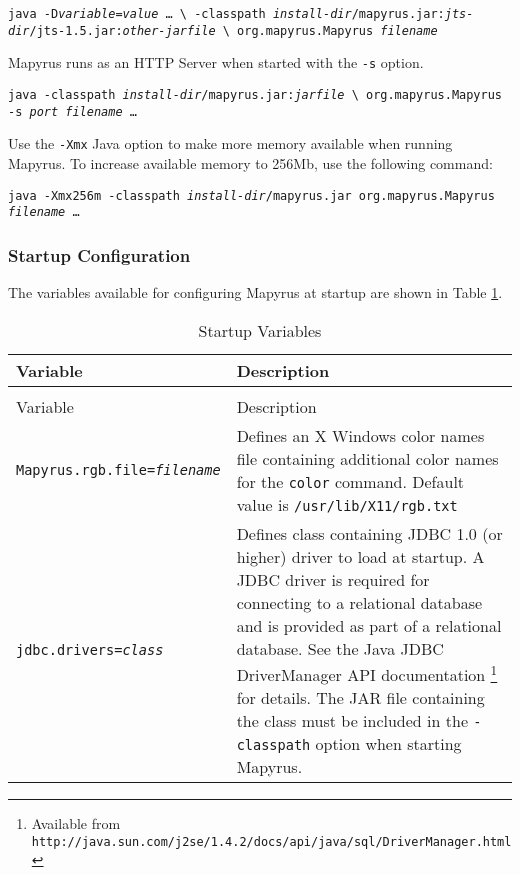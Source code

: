 \begin{alltt}
\texttt{java -D\textit{variable}=\textit{value} \dots\ \textbackslash
  -classpath \textit{install-dir}/mapyrus.jar:\textit{jts-dir}/jts-1.5.jar:\textit{other-jarfile} \textbackslash
  org.mapyrus.Mapyrus \textit{filename}}
\end{alltt}

Mapyrus runs as an HTTP Server when started with the
\texttt{-s} option.

\begin{alltt}
\texttt{java -classpath \textit{install-dir}/mapyrus.jar:\textit{jarfile} \textbackslash
  org.mapyrus.Mapyrus -s \textit{port} \textit{filename} \dots}
\end{alltt}

\label{morememory}
Use the
\texttt{-Xmx} Java option
to make more memory available when running Mapyrus.
To increase available memory to 256Mb, use the following command:

\begin{alltt}
\texttt{java -Xmx256m -classpath \textit{install-dir}/mapyrus.jar org.mapyrus.Mapyrus \textit{filename} \dots}
\end{alltt}

\subsubsection{Startup Configuration}

The variables available for configuring Mapyrus at startup are
shown in Table \ref{startupvariables}.

\begin{longtable}{|l|p{7cm}|}
\hline
\label{startupvariables}
Variable & Description \\
\hline
\hline
\endfirsthead
\hline
\caption{Startup Variables} \\
\endfoot

\hline
Variable & Description \\
\hline
\hline
\endhead

\texttt{Mapyrus.rgb.file=\textit{filename}} &
Defines an X Windows color names file containing additional color names
for the
\texttt{color} command.  Default value is
\texttt{/usr/lib/X11/rgb.txt} \\

\hline

\texttt{jdbc.drivers=\textit{class}} &
Defines class containing JDBC 1.0 (or higher) driver to load at startup.
A JDBC driver is required for connecting to a relational database and
is provided as part of a relational database.
See the Java JDBC DriverManager API documentation
\footnote{Available from
\texttt{http://java.sun.com/j2se/1.4.2/docs/api/java/sql/DriverManager.html}}
for details.
The JAR file containing the class must be included in the \texttt{-classpath}
option when starting Mapyrus. \\

\hline
\end{longtable}


